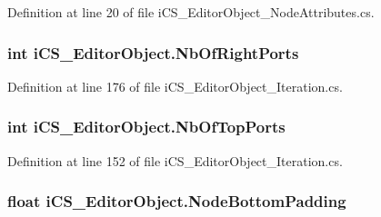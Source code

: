 Definition at line 20 of file i\+C\+S\+\_\+\+Editor\+Object\+\_\+\+Node\+Attributes.\+cs.

\hypertarget{classi_c_s___editor_object_a98e5015fb20baf587350761d6488c88b}{
\subsubsection[{Nb\+Of\+Right\+Ports}]{\setlength{\rightskip}{0pt plus 5cm}int i\+C\+S\+\_\+\+Editor\+Object.\+Nb\+Of\+Right\+Ports\hspace{0.3cm}{\ttfamily [get]}}}\label{classi_c_s___editor_object_a98e5015fb20baf587350761d6488c88b}


Definition at line 176 of file i\+C\+S\+\_\+\+Editor\+Object\+\_\+\+Iteration.\+cs.

\hypertarget{classi_c_s___editor_object_a3f365c395ad0a097d773d35a9804d4f1}{
\subsubsection[{Nb\+Of\+Top\+Ports}]{\setlength{\rightskip}{0pt plus 5cm}int i\+C\+S\+\_\+\+Editor\+Object.\+Nb\+Of\+Top\+Ports\hspace{0.3cm}{\ttfamily [get]}}}\label{classi_c_s___editor_object_a3f365c395ad0a097d773d35a9804d4f1}


Definition at line 152 of file i\+C\+S\+\_\+\+Editor\+Object\+\_\+\+Iteration.\+cs.

\hypertarget{classi_c_s___editor_object_ad0ac325d65c83af402928f8d3108730b}{
\subsubsection[{Node\+Bottom\+Padding}]{\setlength{\rightskip}{0pt plus 5cm}float i\+C\+S\+\_\+\+Editor\+Object.\+Node\+Bottom\+Padding\hspace{0.3cm}{\ttfamily [get]}}}\label{classi_c_s___editor_object_ad0ac325d65c83af402928f8d3108730b}


